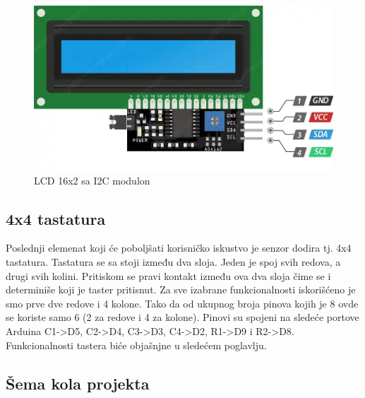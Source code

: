 \documentclass[a4paper, 12pt]{article}
\begin{document}
	\begin{figure}[H]
\centering
\includegraphics[scale=0.6]{images/I2CLCD}
\caption{LCD 16x2 sa I2C modulon} \label{ref:I2CLCD}
\end{figure}
	


	\subsection{4x4 tastatura}
	
	Poslednji elemenat koji će poboljšati korisničko iskustvo je senzor dodira tj. 4x4 tastatura. Tastatura se sa stoji između dva sloja. Jeden je spoj svih redova, a drugi svih kolini. Pritiskom se pravi kontakt između ova dva sloja čime se i determiniše koji je taster pritisnut. Za sve izabrane funkcionalnosti iskorišćeno je smo prve dve redove i 4 kolone. Tako da od ukupnog broja pinova kojih je 8 ovde se koriste samo 6 (2 za redove i 4 za kolone). Pinovi su spojeni na sledeće portove Arduina C1->D5, C2->D4, C3->D3, C4->D2, R1->D9 i R2->D8. Funkcionalnosti tastera biće objašnjne u sledećem poglavlju.
	
\pagebreak


	\subsection*{Šema kola projekta} \label{ref:circuit_diagram}
	
\begin{figure}[H]
\centering
{} 
\end{figure}
\end{document}
